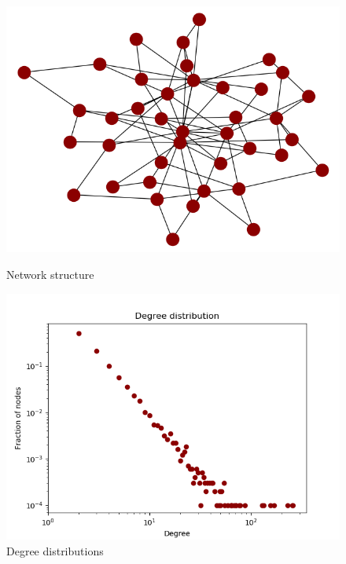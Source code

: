 \documentclass[11pt]{article}
\begin{document}
\begin{figure}
\centering
\begin{minipage}{.5\textwidth}
  \centering
  \includegraphics[width=1\linewidth]{networkplot}
  \caption{Network structure}  
  \label{fig:test3}
  
\end{minipage}%
\begin{minipage}{.5\textwidth}
  \centering
  \includegraphics[width=1\linewidth]{degreedistribution}
  \caption{Degree distributions}
  \label{fig:test4}
 
\end{minipage}%
\end{figure}
\end{document}
